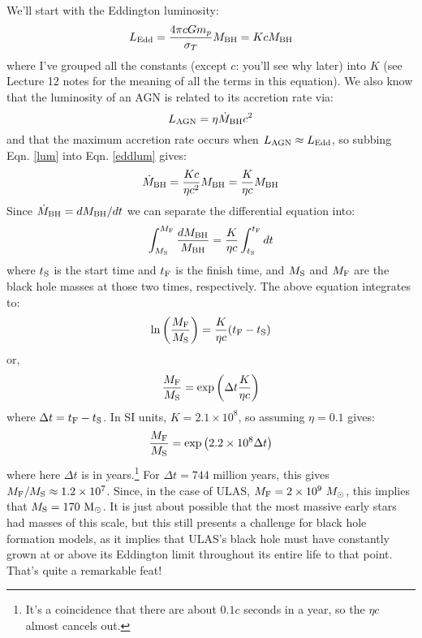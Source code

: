 \documentclass[11pt]{article}
\begin{document}
We'll start with the Eddington luminosity:
\begin{equation}
\label{eddlum}
L_{\rm Edd}=\frac{4\pi c G m_p}{\sigma_T}M_{\rm BH} = KcM_{\rm BH}
\end{equation}
where I've grouped all the constants (except $c$: you'll see why
later) into $K$ (see Lecture 12 notes for the meaning of all the terms
in this equation). We also know that the luminosity of an AGN is
related to its accretion rate via:
\begin{equation}
\label{lum}
L_{\rm AGN} = \eta \dot{M}_{\rm BH}c^2 
\end{equation}
and that the maximum accretion rate occurs when $L_{\rm AGN}\approx
L_{\rm Edd}$, so subbing Eqn. \ref{lum} into Eqn. \ref{eddlum} gives:
\begin{equation}
\dot{M}_{\rm BH} = \frac{Kc}{\eta c^2}M_{\rm BH} = \frac{K}{\eta c}M_{\rm BH}
\end{equation}
Since $\dot{M}_{\rm BH}=dM_{\rm BH}/dt$ we can separate the
differential equation into:
\begin{equation}
\int_{M_{\rm S}}^{M_{\rm F}}{\frac{dM_{\rm BH}}{M_{\rm BH}}} =
{\frac{K}{\eta c}}\int_{t_{\rm S}}^{t_{\rm F}}{dt}
\end{equation}
where $t_{\rm S}$ is the start time and $t_{\rm F}$ is the finish
time, and $M_{\rm S}$ and $M_{\rm F}$ are the black hole masses at
those two times, respectively. The above equation integrates to:
\begin{equation}
{\rm ln}\left(\frac{M_{\rm F}}{M_{\rm S}}\right) = \frac{K}{\eta c}(t_{\rm
  F} - t_{\rm S})
\end{equation}
or, 
\begin{equation}
\frac{M_{\rm F}}{M_{\rm S}} = {\rm exp}\left(\Delta t\frac{K}{\eta c}\right)
\end{equation}
where $\Delta t = t_{\rm F} - t_{\rm S}$. In SI units,
$K=2.1\times10^8$, so assuming $\eta=0.1$ gives:
\begin{equation}
\frac{M_{\rm F}}{M_{\rm S}} = {\rm exp}\left(2.2\times10^8\Delta t\right)
\end{equation}
where here $\Delta t$ is in years.\footnote{It's a coincidence that there
  are about $0.1c$ seconds in a year, so the $\eta c$ almost cancels
  out.} For $\Delta t=744$ million years, this gives
$M_{\rm F}/M_{\rm S}\approx1.2\times10^7$. Since, in the case of ULAS,
$M_{\rm F}=2\times10^9~M_\odot$, this implies that
$M_{\rm S}=170~{\rm M_\odot}$. It is just about possible that the most
massive early stars had masses of this scale, but this still presents
a challenge for black hole formation models, as it implies that ULAS's
black hole must have constantly grown at or above its Eddington limit
throughout its entire life to that point. That's quite a remarkable
feat!
\end{document}

